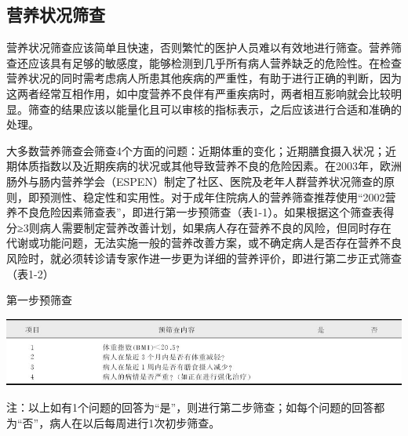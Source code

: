 \hypertarget{text00002.htmlux5cux23mllj3}{%
\subsection{营养状况筛查}\label{text00002.htmlux5cux23mllj3}}

营养状况筛查应该简单且快速，否则繁忙的医护人员难以有效地进行筛查。营养筛查还应该具有足够的敏感度，能够检测到几乎所有病人营养缺乏的危险性。在检查营养状况的同时需考虑病人所患其他疾病的严重性，有助于进行正确的判断，因为这两者经常互相作用，如中度营养不良伴有严重疾病时，两者相互影响就会比较明显。筛查的结果应该以能量化且可以审核的指标表示，之后应该进行合适和准确的处理。

大多数营养筛查会筛查4个方面的问题：近期体重的变化；近期膳食摄入状况；近期体质指数以及近期疾病的状况或其他导致营养不良的危险因素。在2003年，欧洲肠外与肠内营养学会（ESPEN）制定了社区、医院及老年人群营养状况筛查的原则，即预测性、稳定性和实用性。对于成年住院病人的营养筛查推荐使用“2002营养不良危险因素筛查表”，即进行第一步预筛查（表1-1）。如果根据这个筛查表得分≥3则病人需要制定营养改善计划，如果病人存在营养不良的风险，但同时存在代谢或功能问题，无法实施一般的营养改善方案，或不确定病人是否存在营养不良风险时，就必须转诊请专家作进一步更为详细的营养评价，即进行第二步正式筛查（表1-2）

\begin{table}[htbp]
{\centering
\caption{第一步预筛查}
\label{tab1-1}
\includegraphics{./images/Image00000.jpg}}

注：以上如有1个问题的回答为“是”，则进行第二步筛查；如每个问题的回答都为“否”，病人在以后每周进行1次初步筛查。
\end{table}



